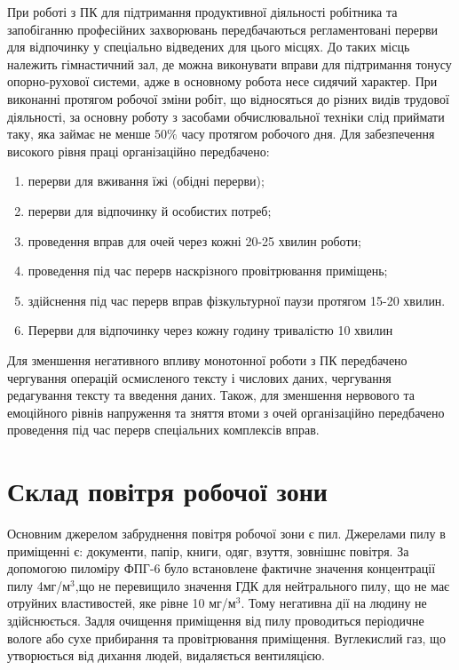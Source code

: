 При роботі з ПК для підтримання продуктивної діяльності робітника та запобіганню
професійних захворювань передбачаються регламентовані перерви для відпочинку
у спеціально відведених для цього місцях.
До таких місць належить гімнастичний зал, де можна виконувати вправи
для підтримання тонусу опорно-рухової системи, 
адже в основному робота несе сидячий характер.
При виконанні протягом робочої зміни робіт, що відносяться до різних видів
трудової діяльності, за основну роботу з засобами обчислювальної техніки
слід приймати таку, яка займає не менше $50\%$ часу протягом робочого дня.
Для забезпечення високого рівня праці організаційно передбачено:
\begin{enumerate}
\item перерви для  вживання їжі (обідні перерви);
\item перерви для відпочинку й особистих потреб;
\item проведення вправ для очей через кожні 20-25 хвилин роботи;
\item проведення під час перерв наскрізного провітрювання приміщень;
\item здійснення під час перерв вправ фізкультурної паузи протягом 15-20 хвилин.
\item Перерви для відпочинку через кожну годину тривалістю 10 хвилин
\end{enumerate}
Для зменшення негативного впливу монотонної роботи з ПК передбачено чергування
операцій осмисленого тексту і числових даних, чергування редагування тексту та
введення даних.
Також, для зменшення  нервового та емоційного рівнів напруження та зняття втоми
з очей організаційно передбачено проведення під час перерв спеціальних
комплексів вправ.

\section{Склад повітря робочої зони}

Основним джерелом забруднення повітря робочої зони є пил. 
Джерелами пилу в приміщенні є: документи, папір, книги, одяг, взуття, зовнішнє
повітря.
За допомогою пиломіру ФПГ-6 було встановлене фактичне значення концентрації
пилу 4мг/м$^3$,що не перевищило значення ГДК для нейтрального пилу,
що не має отруйних властивостей, яке рівне 10 мг/м$^3$. 
Тому негативна дії на людину не здійснюється. 
Задля очищення приміщення від пилу проводиться періодичне вологе
або сухе прибирання та провітрювання приміщення. 
Вуглекислий газ, що утворюється від дихання людей, видаляється вентиляцією.

